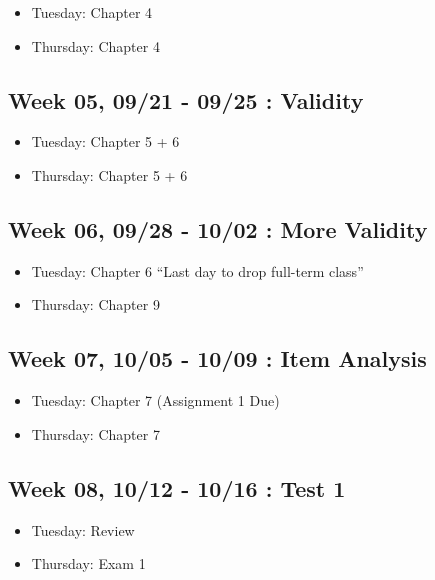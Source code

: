 \documentclass[11pt,]{article}
\providecommand{\tightlist}{%
  \setlength{\itemsep}{0pt}\setlength{\parskip}{0pt}}
\begin{document}
\begin{itemize}
\tightlist
\item
  Tuesday: Chapter 4
\item
  Thursday: Chapter 4
\end{itemize}

\subsection{Week 05, 09/21 - 09/25 :
Validity}\label{week-05-0921---0925-validity}

\begin{itemize}
\tightlist
\item
  Tuesday: Chapter 5 + 6
\item
  Thursday: Chapter 5 + 6
\end{itemize}

\subsection{Week 06, 09/28 - 10/02 : More
Validity}\label{week-06-0928---1002-more-validity}

\begin{itemize}
\tightlist
\item
  Tuesday: Chapter 6 ``Last day to drop full-term class''
\item
  Thursday: Chapter 9
\end{itemize}

\subsection{Week 07, 10/05 - 10/09 : Item
Analysis}\label{week-07-1005---1009-item-analysis}

\begin{itemize}
\tightlist
\item
  Tuesday: Chapter 7 (Assignment 1 Due)
\item
  Thursday: Chapter 7
\end{itemize}

\subsection{Week 08, 10/12 - 10/16 : Test
1}\label{week-08-1012---1016-test-1}

\begin{itemize}
\tightlist
\item
  Tuesday: Review
\item
  Thursday: Exam 1
\end{itemize}
\end{document}

